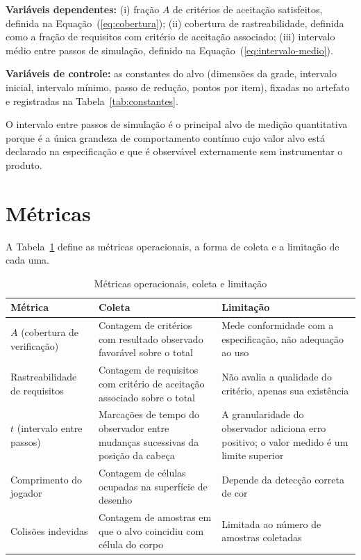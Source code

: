 \textbf{Variáveis dependentes:} (i) fração $A$ de critérios de aceitação
satisfeitos, definida na Equação~(\ref{eq:cobertura}); (ii) cobertura de
rastreabilidade, definida como a fração de requisitos com critério de aceitação
associado; (iii) intervalo médio entre passos de simulação, definido na
Equação~(\ref{eq:intervalo-medio}).

\textbf{Variáveis de controle:} as constantes do alvo (dimensões da grade,
intervalo inicial, intervalo mínimo, passo de redução, pontos por item), fixadas
no artefato e registradas na Tabela~\ref{tab:constantes}.

O intervalo entre passos de simulação é o principal alvo de medição quantitativa
porque é a única grandeza de comportamento contínuo cujo valor alvo está declarado
na especificação e que é observável externamente sem instrumentar o produto.

\section{Métricas}
\label{sec:metricas}

A Tabela~\ref{tab:metricas} define as métricas operacionais, a forma de coleta e
a limitação de cada uma.

\begin{table}[htb]
	\caption{Métricas operacionais, coleta e limitação}
	\label{tab:metricas}
	\centering
	\footnotesize
	\begin{tabularx}{\textwidth}{@{}p{2.6cm} X p{3.6cm}@{}}
		\toprule
		\textbf{Métrica} & \textbf{Coleta} & \textbf{Limitação} \\
		\midrule
		$A$ (cobertura de verificação) & Contagem de critérios com resultado observado favorável sobre o total & Mede conformidade com a especificação, não adequação ao uso \\
		\addlinespace
		Rastreabilidade de requisitos & Contagem de requisitos com critério de aceitação associado sobre o total & Não avalia a qualidade do critério, apenas sua existência \\
		\addlinespace
		$t$ (intervalo entre passos) & Marcações de tempo do observador entre mudanças sucessivas da posição da cabeça & A granularidade do observador adiciona erro positivo; o valor medido é um limite superior \\
		\addlinespace
		Comprimento do jogador & Contagem de células ocupadas na superfície de desenho & Depende da detecção correta de cor \\
		\addlinespace
		Colisões indevidas & Contagem de amostras em que o alvo coincidiu com célula do corpo & Limitada ao número de amostras coletadas \\
		\bottomrule
	\end{tabularx}
\end{table}


